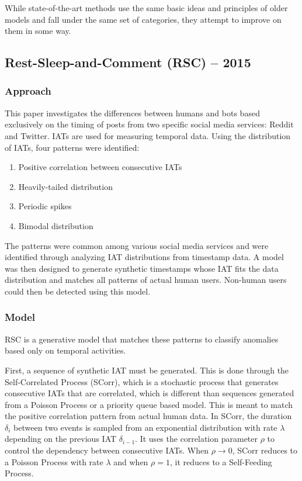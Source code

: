 \documentclass[11pt, oneside]{article}   	%
\begin{document}
\quad While state-of-the-art methods use the same basic ideas and principles of older models and fall under the same set of categories, they attempt to improve on them in some way.

\subsection*{Rest-Sleep-and-Comment (RSC) -- 2015}

\subsubsection*{Approach}

\quad This paper investigates the differences between humans and bots based exclusively on the timing of posts from two specific social media services: Reddit and Twitter.
IATs are used for measuring temporal data.
Using the distribution of IATs, four patterns were identified:
\begin{enumerate}
	\item Positive correlation between consecutive IATs
	\item Heavily-tailed distribution
	\item Periodic spikes
	\item Bimodal distribution
\end{enumerate}
\quad The patterns were common among various social media services and were identified through analyzing IAT distributions from timestamp data.
A model was then designed to generate synthetic timestamps whose IAT fits the data distribution and matches all patterns of actual human users.
Non-human users could then be detected using this model.

\subsubsection*{Model}

\quad RSC is a generative model that matches these patterns to classify anomalies based only on temporal activities.

\quad First, a sequence of synthetic IAT must be generated.
This is done through the Self-Correlated Process (SCorr), which is a stochastic process that generates consecutive IATs that are correlated, which is different than sequences generated from a Poisson Process or a priority queue based model.
This is meant to match the positive correlation pattern from actual human data.
In SCorr, the duration $\delta_i$ between two events is sampled from an exponential distribution with rate $\lambda$ depending on the previous IAT $\delta_{i-1}$. It uses the correlation parameter $\rho$ to control the dependency between consecutive IATs. When $\rho \rightarrow 0$, SCorr reduces to a Poisson Process with rate $\lambda$ and when $\rho = 1$, it reduces to a Self-Feeding Process.
\end{document}
